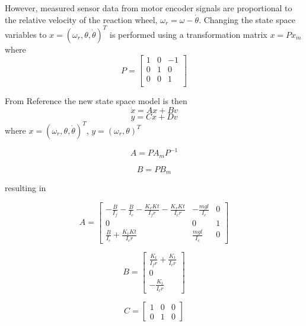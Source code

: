 \documentclass[12pt,letterpaper]{article}
\begin{document}
However, measured sensor data from motor encoder signals are proportional to the relative velocity of the 
reaction wheel, $\omega_{r} = \omega - \dot{\theta}$.  Changing the state space variables to $x = (\omega_{r}, \theta, \dot{\theta})^{T}$ is performed using a transformation matrix $x = P x_{m}$ where
\begin{equation}
 P = 
\begin{bmatrix}
1 & 0 & -1\\
0 & 1 & 0\\
0 & 0 & 1\\
\end{bmatrix}
\end{equation}

From Reference \cite{book} the new state space model is then
\begin{equation}
\dot{x} = A x + B v
\end{equation}
\begin{equation}
y = C x + D v
\end{equation}
where $x = (\omega_{r}, \theta, \dot{\theta})^{T}$,  $y=(\omega_{r},\theta)^{T}$

\begin{equation}
A = P A_{m} P^{-1}
\end{equation}

\begin{equation}
B = P B_{m}
\end{equation}

resulting in

\begin{equation}
A = 
\begin{bmatrix}
-\frac{B}{I_{f}}-\frac{B}{I_{c}}-\frac{K_{v} K{t}}{I_{f} r}-\frac{K_{v} K{t}}{I_{c} r}  & -\frac{mgl}{I_{c}} & 0 \\
0 & 0 & 1\\
\frac{B}{I_{c}}+\frac{K_{v} K{t}}{I_{c} r} & \frac{mgl}{I_{c}} & 0
\end{bmatrix}
\end{equation}

\begin{equation}
B = 
\begin{bmatrix}
\frac{K_{t}}{I_{f} r} + \frac{K_{t}}{I_{c} r}\\
0 \\
 -\frac{K_{t}}{I_{c} r}
\end{bmatrix}
\end{equation}

\begin{equation}
C = 
\begin{bmatrix}
1 & 0 & 0 \\
0 & 1 & 0 
\end{bmatrix}
\end{equation}
\end{document}
